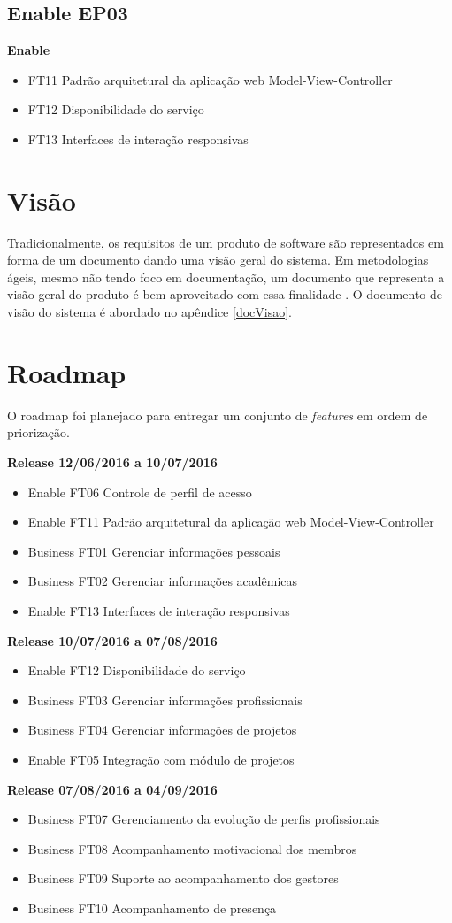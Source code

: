\subsection{Enable EP03}
\textbf{Enable}
\begin{itemize}
    \item FT11 Padrão arquitetural da aplicação web Model-View-Controller
    \item FT12 Disponibilidade do serviço
    \item FT13 Interfaces de interação responsivas
\end{itemize}
\section{Visão}

Tradicionalmente, os requisitos de um produto de software são representados em forma de um documento dando uma visão geral do sistema. Em metodologias ágeis, mesmo não tendo foco em documentação, um documento que representa a visão geral do produto é bem aproveitado com essa finalidade \cite{leffingwell2011}. O documento de visão do sistema é abordado no apêndice \ref{docVisao}.

\section{Roadmap}

O roadmap foi planejado para entregar um conjunto de \textit{features} em ordem de priorização.

\textbf{Release 12/06/2016 a 10/07/2016}
\begin{itemize}
    \item Enable FT06 Controle de perfil de acesso
    \item Enable FT11 Padrão arquitetural da aplicação web Model-View-Controller
    \item Business FT01 Gerenciar informações pessoais
    \item Business FT02 Gerenciar informações acadêmicas
    \item Enable FT13 Interfaces de interação responsivas
\end{itemize}
\textbf{Release 10/07/2016 a 07/08/2016}
\begin{itemize}
    \item Enable FT12 Disponibilidade do serviço
    \item Business FT03 Gerenciar informações profissionais
    \item Business FT04 Gerenciar informações de projetos
    \item Enable FT05 Integração com módulo de projetos
\end{itemize}
\textbf{Release 07/08/2016 a 04/09/2016}
\begin{itemize}
    \item Business FT07 Gerenciamento da evolução de perfis profissionais
    \item Business FT08 Acompanhamento motivacional dos membros
    \item Business FT09 Suporte ao acompanhamento dos gestores
    \item Business FT10 Acompanhamento de presença
\end{itemize}
